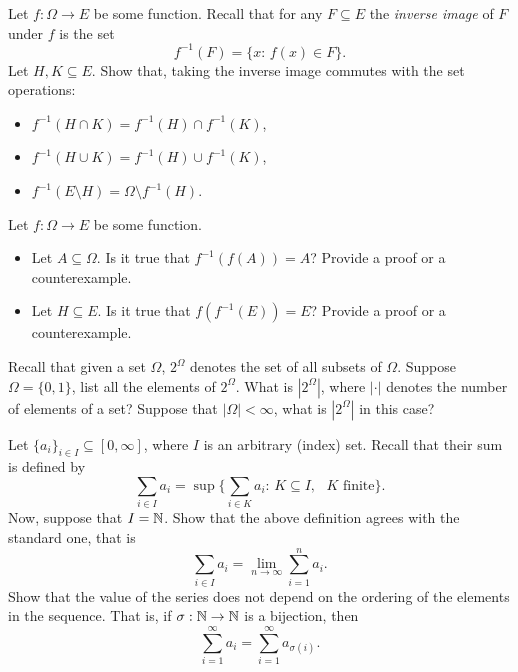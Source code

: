 \begin{problem}Let $f:\Omega \to E$ be some function. Recall that for any $F\subseteq E$ the \emph{inverse image} of $F$ under $f$ is the set 
    \begin{equation*}
        f^{-1}(F) = \{x:\,f(x)\in F\}.
    \end{equation*}
    Let $H,K\subseteq E$. Show that, taking the inverse image commutes with the set operations:
\begin{itemize}
        \item $f^{-1}(H\cap K) = f^{-1}(H)\cap f^{-1}(K)$,
        \item $f^{-1}(H\cup K) = f^{-1}(H)\cup f^{-1}(K)$,
        \item $f^{-1}(E\setminus H) = \Omega \setminus f^{-1}(H)$.
\end{itemize}
\end{problem}

\begin{problem} Let $f:\Omega \to E$ be some function.
    \begin{itemize}
        \item Let $A\subseteq \Omega$. Is it true that $f^{-1}(f(A)) = A$? Provide a proof or a counterexample.
        \item Let $H\subseteq E$.  Is it true that $f(f^{-1}(E)) = E$? Provide a proof or a counterexample.
    \end{itemize}
\end{problem}

\begin{problem} Recall that given a set $\Omega$, $2^{\Omega}$ denotes the set of all subsets of $\Omega$. Suppose $\Omega = \{0,1\}$, list all the elements of $2^{\Omega}$. What is $|2^{\Omega}|$, where $|\cdot|$ denotes the number of elements of a set? Suppose that $|\Omega|<\infty$, what is $|2^{\Omega}|$ in this case? 
\end{problem}

\begin{problem} Let $\{a_i\}_{i\in I} \subseteq [0,\infty]$, where $I$ is an arbitrary (index) set. Recall that their sum is defined by
    \begin{equation*}
        \sum_{i\in I} a_i = \sup\Big\{\sum_{i\in K} a_i:\, K\subseteq I,\text{ $K$ finite}\Big\}.
    \end{equation*}
Now, suppose that $I = \mathbb N$. Show that the above definition agrees with the standard one, that is
\begin{equation*}
    \sum_{i\in I} a_i = \lim_{n\to\infty} \sum_{i=1}^n a_i.
\end{equation*}
Show that the value of the series does not depend on the ordering of the elements in the sequence. That is, if $\sigma:\mathbb N\to \mathbb N$ is a bijection, then 
\begin{equation*}
    \sum_{i=1}^\infty a_i = \sum_{i=1}^\infty a_{\sigma(i)}.
\end{equation*}
\end{problem}

